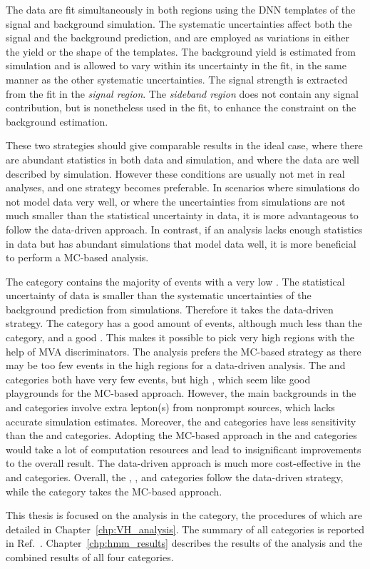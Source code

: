 \begin{itemize}
          The data are fit simultaneously in both regions using the DNN templates of the signal and background simulation. 
          The systematic uncertainties affect both the signal and the background prediction, and are employed as variations in either the yield or the shape of the templates.
          The background yield is estimated from simulation and is allowed to vary within its uncertainty in the fit, in the same manner as the other systematic uncertainties.
          The signal strength is extracted from the fit in the \textit{signal region}.
          The \textit{sideband region} does not contain any signal contribution, but is nonetheless used in the fit, to enhance the constraint on the background estimation.
\end{itemize}

These two strategies should give comparable results in the ideal case, where there are abundant statistics in both data and simulation,
and where the data are well described by simulation.
However these conditions are usually not met in real analyses, and one strategy becomes preferable.
In scenarios where simulations do not model data very well, or where the uncertainties from simulations are not much smaller than the statistical uncertainty in data,
it is more advantageous to follow the data-driven approach.
In contrast, if an analysis lacks enough statistics in data but has abundant simulations that model data well, 
it is more beneficial to perform a MC-based analysis.

The \ggH category contains the majority of \hmm events with a very low \SoB. 
The statistical uncertainty of data is smaller than the systematic uncertainties of the background prediction from simulations.
Therefore it takes the data-driven strategy.
The \qqH category has a good amount of events, although much less than the \ggH category, and a good \SoB.
This makes it possible to pick very high \SoB regions with the help of MVA discriminators. 
The \qqH analysis prefers the MC-based strategy as there may be too few events in the high \SoB regions for a data-driven analysis.
The \VH and \ttH categories both have very few events, but high \SoB, which seem like good playgrounds for the MC-based approach.
However, the main backgrounds in the \VH and \ttH categories involve extra lepton(s) from nonprompt sources, which lacks accurate simulation estimates.
Moreover, the \VH and \ttH categories have less sensitivity than the \ggH and \qqH categories.
Adopting the MC-based approach in the \VH and \ttH categories would take a lot of computation resources and lead to insignificant improvements to the overall result.
The data-driven approach is much more cost-effective in the \VH and \ttH categories.
Overall, the \ggH, \VH, and \ttH categories follow the data-driven strategy, while the \qqH category takes the MC-based approach.

This thesis is focused on the analysis in the \VH category, the procedures of which are detailed in Chapter~\ref{chp:VH_analysis}.
The summary of all categories is reported in Ref.~\cite{Sirunyan_2021}.
Chapter~\ref{chp:hmm_results} describes the results of the \VH analysis and the combined results of all four categories.
